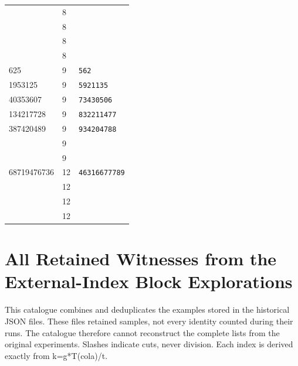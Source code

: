 \documentclass[11pt,a4paper]{article}
\begin{document}
\begin{longtable}{@{}P{\dimexpr(\tabcolsep)/3\relax}P{\dimexpr(\tabcolsep)/3\relax}P{\dimexpr(\tabcolsep)/3\relax}@{}}
 & 8 & \texttt{} \\
 & 8 & \texttt{} \\
 & 8 & \texttt{} \\
 & 8 & \texttt{} \\
625 & 9 & \texttt{562} \\
1953125 & 9 & \texttt{5921135} \\
40353607 & 9 & \texttt{73430506} \\
134217728 & 9 & \texttt{832211477} \\
387420489 & 9 & \texttt{934204788} \\
 & 9 & \texttt{} \\
 & 9 & \texttt{} \\
68719476736 & 12 & \texttt{46316677789} \\
 & 12 & \texttt{} \\
 & 12 & \texttt{} \\
 & 12 & \texttt{} \\
\end{longtable}
\endgroup


\section{All Retained Witnesses from the External-Index Block Explorations}

This catalogue combines and deduplicates the examples stored in the historical JSON files. These files retained samples, not every identity counted during their runs. The catalogue therefore cannot reconstruct the complete lists from the original experiments. Slashes indicate cuts, never division. Each index is derived exactly from k=g*T(cola)/t.
\end{document}
